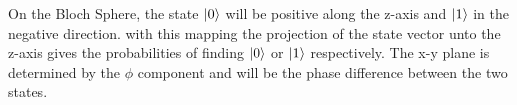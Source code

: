 On the Bloch Sphere, the state $\ket{0}$ will be positive along the z-axis and $\ket{1}$ in the negative direction. with this mapping the projection of the state vector unto the z-axis gives the probabilities of finding $\ket{0}$ or $\ket{1}$ respectively. The x-y plane is determined by the $\phi$ component and will be the phase difference between the two states. 








